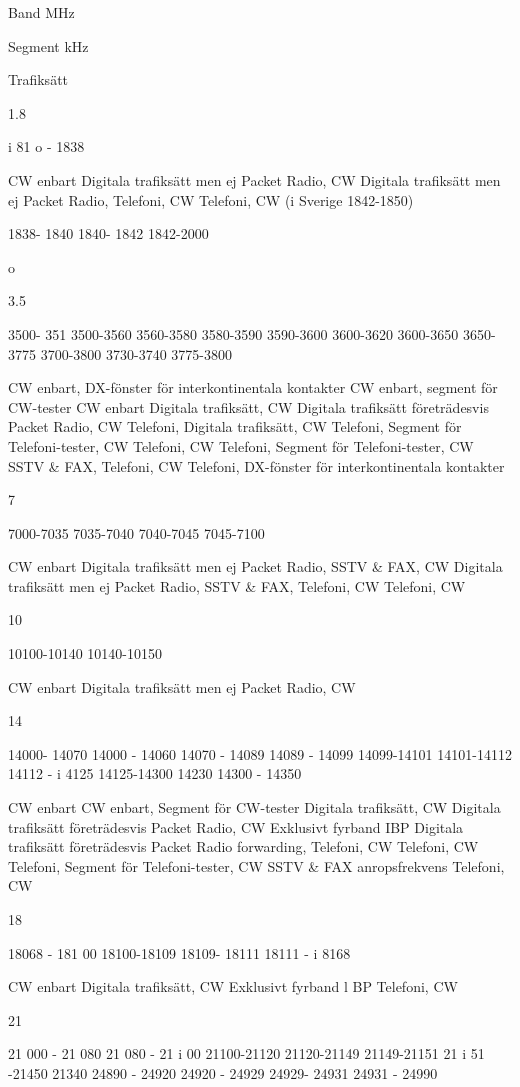 \documentclass[a4paper,twoside,twocolumn,openright]{book}
\begin{document}
{{{{{{{{{{{Band
MHz

Segment
kHz

Trafiksätt

1.8

i 81 o - 1838

CW enbart
Digitala trafiksätt men ej Packet Radio, CW
Digitala trafiksätt men ej Packet Radio, Telefoni, CW
Telefoni, CW
(i Sverige 1842-1850)

1838- 1840
1840- 1842
1842-2000

o

3.5

3500- 351
3500-3560
3560-3580
3580-3590
3590-3600
3600-3620
3600-3650
3650-3775
3700-3800
3730-3740
3775-3800

CW enbart, DX-fönster för interkontinentala kontakter
CW enbart, segment för CW-tester
CW enbart
Digitala trafiksätt, CW
Digitala trafiksätt företrädesvis Packet Radio, CW
Telefoni, Digitala trafiksätt, CW
Telefoni, Segment för Telefoni-tester, CW
Telefoni, CW
Telefoni, Segment för Telefoni-tester, CW
SSTV \& FAX, Telefoni, CW
Telefoni, DX-fönster för interkontinentala kontakter

7

7000-7035
7035-7040
7040-7045
7045-7100

CW enbart
Digitala trafiksätt men ej Packet Radio, SSTV \& FAX, CW
Digitala trafiksätt men ej Packet Radio, SSTV \& FAX, Telefoni, CW
Telefoni, CW

10

10100-10140
10140-10150

CW enbart
Digitala trafiksätt men ej Packet Radio, CW

14

14000- 14070
14000 - 14060
14070 - 14089
14089 - 14099
14099-14101
14101-14112
14112 - i 4125
14125-14300
14230
14300 - 14350

CW enbart
CW enbart, Segment för CW-tester
Digitala trafiksätt, CW
Digitala trafiksätt företrädesvis Packet Radio, CW
Exklusivt fyrband IBP
Digitala trafiksätt företrädesvis Packet Radio forwarding, Telefoni, CW
Telefoni, CW
Telefoni, Segment för Telefoni-tester, CW
SSTV \& FAX anropsfrekvens
Telefoni, CW

18

18068 - 181 00
18100-18109
18109- 18111
18111 - i 8168

CW enbart
Digitala trafiksätt, CW
Exklusivt fyrband l BP
Telefoni, CW

21

21 000 - 21 080
21 080 - 21 i 00
21100-21120
21120-21149
21149-21151
21 i 51 -21450
21340
24890 - 24920
24920 - 24929
24929- 24931
24931 - 24990

}}}}}}}}}}}
\end{document}
